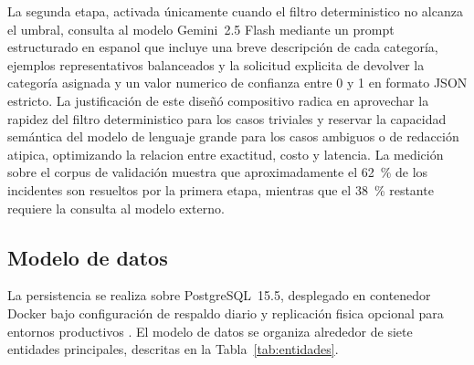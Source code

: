 La segunda etapa, activada únicamente cuando el filtro deterministico no alcanza el umbral, consulta al modelo Gemini~2.5 Flash mediante un prompt estructurado en espanol que incluye una breve descripción de cada categoría, ejemplos representativos balanceados y la solicitud explicita de devolver la categoría asignada y un valor numerico de confianza entre 0 y 1 en formato JSON estricto. La justificación de este diseñó compositivo radica en aprovechar la rapidez del filtro deterministico para los casos triviales y reservar la capacidad semántica del modelo de lenguaje grande para los casos ambiguos o de redacción atipica, optimizando la relacion entre exactitud, costo y latencia. La medición sobre el corpus de validación muestra que aproximadamente el 62~\% de los incidentes son resueltos por la primera etapa, mientras que el 38~\% restante requiere la consulta al modelo externo.

\subsection{Modelo de datos}

La persistencia se realiza sobre PostgreSQL~15.5, desplegado en contenedor Docker bajo configuración de respaldo diario y replicación fisica opcional para entornos productivos \parencite{PostgreSQL2024_docs}. El modelo de datos se organiza alrededor de siete entidades principales, descritas en la Tabla~\ref{tab:entidades}.

